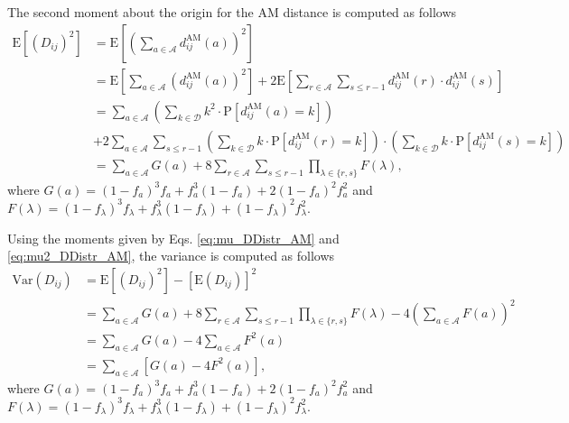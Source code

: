 \documentclass[10pt,letterpaper]{article}\usepackage[]{graphicx}\usepackage[]{color}
\begin{document}
The second moment about the origin for the AM distance is computed as follows
%
\begin{equation}\label{eq:mu2_DDistr_AM}
\begin{aligned}
\text{E}\left[\left(D_{ij}\right)^2\right] &= \text{E}\left[\left(\sum_{a \in \mathcal{A}} d^\text{AM}_{ij}(a)\right)^2\right] \\
&= \text{E}\left[\sum_{a \in \mathcal{A}} \left(d^\text{AM}_{ij}(a)\right)^2\right] + 2 \text{E}\left[\sum_{r \in \mathcal{A}} \sum_{s \leq r - 1} d^\text{AM}_{ij}(r) \cdot d^\text{AM}_{ij}(s)\right] \\
&= \sum_{a \in \mathcal{A}} \left(\sum_{k \in \mathcal{D}} k^2 \cdot \text{P}\left[d^\text{AM}_{ij}(a) = k\right]\right) \\
&+ 2\sum_{a \in \mathcal{A}} \sum_{s \leq r - 1} \left(\sum_{k \in \mathcal{D}} k \cdot \text{P}\left[d^\text{AM}_{ij}(r) = k\right]\right) \cdot \left(\sum_{k \in \mathcal{D}} k \cdot \text{P}\left[d^\text{AM}_{ij}(s) = k\right]\right) \\
&= \sum_{a \in \mathcal{A}} G(a) + 8 \sum_{r \in \mathcal{A}} \sum_{s \leq r - 1} \prod_{\lambda \in \{r,s\}} F(\lambda),
\end{aligned}
\end{equation}
where $G(a) = (1 - f_a)^3 f_a + f^3_a (1 - f_a) + 2 (1 - f_a)^2 f^2_a$ and $F(\lambda) = (1 - f_\lambda)^3 f_\lambda + f^3_\lambda (1 - f_\lambda) + (1 - f_\lambda)^2 f^2_\lambda$.

Using the moments given by Eqs. \ref{eq:mu_DDistr_AM} and \ref{eq:mu2_DDistr_AM}, the variance is computed as follows
%
\begin{equation}\label{eq:var_DDistr_AM}
\begin{aligned}
\text{Var}(D_{ij}) &= \text{E}\left[(D_{ij})^2\right] - \left[\text{E}(D_{ij})\right]^2 \\
&= \sum_{a \in \mathcal{A}} G(a) + 8\sum_{r \in \mathcal{A}} \sum_{s \leq r - 1} \prod_{\lambda \in \{r,s\}} F(\lambda) - 4\left(\sum_{a \in \mathcal{A}}F(a)\right)^2 \\
&= \sum_{a \in \mathcal{A}} G(a) - 4\sum_{a \in \mathcal{A}}F^2(a) \\
&= \sum_{a \in \mathcal{A}} \left[G(a)- 4F^2(a)\right],
\end{aligned}
\end{equation}
where $G(a) = (1 - f_a)^3 f_a + f^3_a (1 - f_a) + 2 (1 - f_a)^2 f^2_a$ and $F(\lambda) = (1 - f_\lambda)^3 f_\lambda + f^3_\lambda (1 - f_\lambda) + (1 - f_\lambda)^2 f^2_\lambda$.
\end{document}
